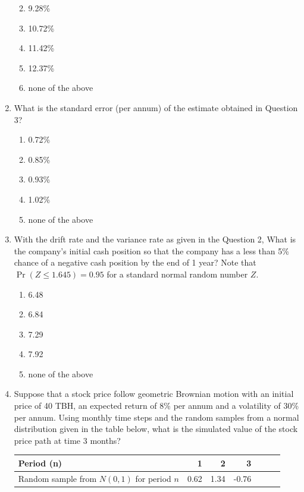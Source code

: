 \documentclass[
]{book}
\theoremstyle{definition}
\theoremstyle{definition}
\theoremstyle{definition}
\theoremstyle{definition}
\theoremstyle{remark}
\begin{document}
\begin{enumerate}
  \begin{enumerate}
  \def\labelenumii{\Alph{enumii}.}
  \item
    9.28\%
  \item
    10.72\%
  \item
    11.42\%
  \item
    12.37\%
  \item
    none of the above
  \end{enumerate}
\item
  What is the standard error (per annum) of the estimate obtained in Question 3?

  \begin{enumerate}
  \def\labelenumii{\Alph{enumii}.}
  \item
    0.72\%
  \item
    0.85\%
  \item
    0.93\%
  \item
    1.02\%
  \item
    none of the above
  \end{enumerate}
\item
  With the drift rate and the variance rate as given in the Question 2, What is the
  company's initial cash position so that the company has a less than
  5\% chance of a negative cash position by the end of 1 year? Note
  that \(\Pr( Z \le 1.645) = 0.95\) for a standard normal random number
  \(Z\).

  \begin{enumerate}
  \def\labelenumii{\Alph{enumii}.}
  \item
    6.48
  \item
    6.84
  \item
    7.29
  \item
    7.92
  \item
    none of the above
  \end{enumerate}
\item
  Suppose that a stock price follow geometric Brownian motion with an
  initial price of 40 TBH, an expected return of 8\% per annum and a
  volatility of 30\% per annum. Using monthly time steps and the random
  samples from a normal distribution given in the table below, what is
  the simulated value of the stock price path at time 3 months?

  \begin{longtable}[]{@{}lrrrlll@{}}
  \toprule\noalign{}
  Period (n) & 1 & 2 & 3 & & & \\
  \midrule\noalign{}
  \endhead
  \bottomrule\noalign{}
  \endlastfoot
  Random sample from \(N(0,1)\) for period \(n\) & 0.62 & 1.34 & -0.76 & & & \\
  \end{longtable}


\end{enumerate}
\end{document}
